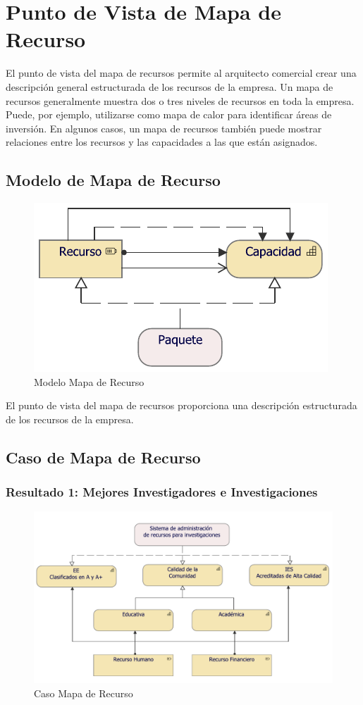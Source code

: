 \section{Punto de Vista de Mapa de Recurso}

El punto de vista del mapa de recursos permite al arquitecto comercial crear una descripción general estructurada de los recursos de la empresa. Un mapa de recursos generalmente muestra dos o tres niveles de recursos en toda la empresa. Puede, por ejemplo, utilizarse como mapa de calor para identificar áreas de inversión. En algunos casos, un mapa de recursos también puede mostrar relaciones entre los recursos y las capacidades a las que están asignados.

\subsection{Modelo de Mapa de Recurso}
\begin{figure}[h!]
	\centering
	\includegraphics[width=.5\linewidth]{imgs/caso/MapaRecurso.pdf}
	\caption{Modelo Mapa de Recurso}
\end{figure}

El punto de vista del mapa de recursos proporciona una descripción estructurada de los recursos de la empresa.

\newpage

\subsection{Caso de Mapa de Recurso}

\subsubsection{Resultado 1: Mejores Investigadores e Investigaciones}

\begin{figure}[h!]
	\centering
	\includegraphics[width=1\linewidth]{imgs/modelo/estrategia/mapa/mapa_recurso.pdf}
	\caption{Caso Mapa de Recurso}
\end{figure}

